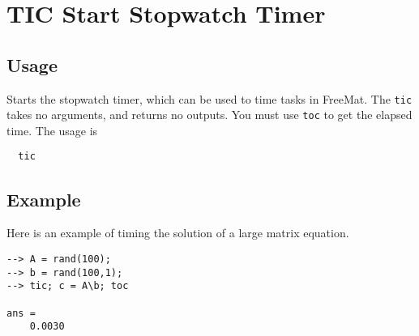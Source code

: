 \section{TIC Start Stopwatch Timer}

\subsection{Usage}

Starts the stopwatch timer, which can be used to time tasks in FreeMat.
The \verb|tic| takes no arguments, and returns no outputs.  You must use
\verb|toc| to get the elapsed time.  The usage is
\begin{verbatim}
  tic
\end{verbatim}
\subsection{Example}

Here is an example of timing the solution of a large matrix equation.
\begin{verbatim}
--> A = rand(100);
--> b = rand(100,1);
--> tic; c = A\b; toc

ans = 
    0.0030 
\end{verbatim}
